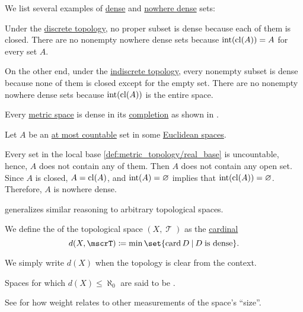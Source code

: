 \begin{example}\label{ex:def:topologically_dense_set}
  We list several examples of \hyperref[def:topologically_dense_set]{dense} and \hyperref[def:topologically_dense_set]{nowhere dense} sets:
  \begin{thmenum}
     Under the \hyperref[def:discrete_topology]{discrete topology}, no proper subset is dense because each of them is closed. There are no nonempty nowhere dense sets because \( \operatorname{int}(\operatorname{cl}(A)) = A \) for every set \( A \).

     On the other end, under the \hyperref[def:indiscrete_topology]{indiscrete topology}, every nonempty subset is dense because none of them is closed except for the empty set. There are no nonempty nowhere dense sets because \( \operatorname{int}(\operatorname{cl}(A)) \) is the entire space.

     Every \hyperref[def:metric_space]{metric space} is dense in its \hyperref[thm:metric_space_completion]{completion} as shown in .

     Let \( A \) be an \hyperref[def:set_countability/at_most_countable]{at most countable} set in some \hyperref[def:euclidean_space]{Euclidean spaces}.

    Every set in the local base \eqref{def:metric_topology/real_base} is uncountable, hence, \( A \) does not contain any of them. Then \( A \) does not contain any open set. Since \( A \) is closed, \( A = \operatorname{cl}(A) \), and \( \operatorname{int}(A) = \varnothing \) implies that \( \operatorname{int}(\operatorname{cl}(A)) = \varnothing \). Therefore, \( A \) is nowhere dense.

     generalizes similar reasoning to arbitrary topological spaces.
  \end{thmenum}
\end{example}

\begin{definition}\label{def:topological_space_density}
  We define the  of the topological space \( (X, \mscrT) \) as the \hyperref[def:cardinal]{cardinal}
  \begin{equation*}
    d(X, \mscrT) \coloneqq \min \set{ \card D \given D \T{is dense} }.
  \end{equation*}

  We simply write \( d(X) \) when the topology is clear from the context.

  Spaces for which \( d(X) \leq \hyperref[def:aleph_hierarchy]{\aleph_0} \) are said to be .

  See  for how weight relates to other measurements of the space's \enquote{size}.
\end{definition}

